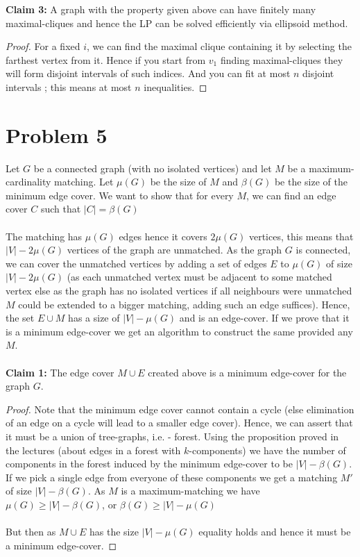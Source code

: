 \documentclass{article}
\numberwithin{equation}{section}
\begin{document}
 \noindent \textbf{Claim 3:} A graph with the property given above can have finitely many maximal-cliques and hence the LP can be solved efficiently via ellipsoid method. 
 \begin{proof}
     For a fixed $i$, we can find the maximal clique containing it by selecting the farthest vertex from it. Hence if you start from $v_1$ finding maximal-cliques they will form disjoint intervals of such indices. And you can fit at most $n$ disjoint intervals ; this means at most $n$ inequalities. 
 \end{proof}
\newpage
\section{Problem 5} %
Let $G$ be a connected graph (with no isolated vertices) and let $M$ be a maximum-cardinality matching. Let $\mu(G)$ be the size of $M$ and $\beta(G)$ be the size of the minimum edge cover. We want to show that for every $M$, we can find an edge cover $C$ such that $|C| = \beta(G)$\\\\
The matching has $\mu(G)$ edges hence it covers $2\mu(G)$ vertices, this means that $|V| - 2 \mu(G)$ vertices of the graph are unmatched. As the graph $G$ is connected, we can cover the unmatched vertices by adding a set of edges $E$ to $\mu(G)$ of size $|V| - 2 \mu(G)$ (as each unmatched vertex must be adjacent to some matched vertex else as the graph has no isolated vertices if all neighbours were unmatched $M$ could be extended to a bigger matching, adding such an edge suffices). Hence, the set $E\cup M$ has a size of $|V| - \mu(G)$ and is an edge-cover. If we prove that it is a minimum edge-cover we get an algorithm to construct the same provided any $M$. \\\\
\textbf{Claim 1:} The edge cover $M\cup E$ created above is a minimum edge-cover for the graph $G$. 
\begin{proof}
    Note that the minimum edge cover cannot contain a cycle (else elimination of an edge on a cycle will lead to a smaller edge cover). Hence, we can assert that it must be a union of tree-graphs, i.e. - forest. Using the proposition proved in the lectures (about edges in a forest with $k$-components) we have the number of components in the forest induced by the minimum edge-cover to be $|V| - \beta(G)$. If we pick a single edge from everyone of these components we get a matching $M'$ of size $|V| - \beta(G)$. As $M$ is a maximum-matching we have $\mu(G) \ge |V| - \beta(G)$, or $\beta(G) \ge |V| - \mu(G)$\\\\
    But then as $M\cup E$ has the size $|V| - \mu(G)$ equality holds and hence it must be a minimum edge-cover. 
\end{proof}
\end{document}
